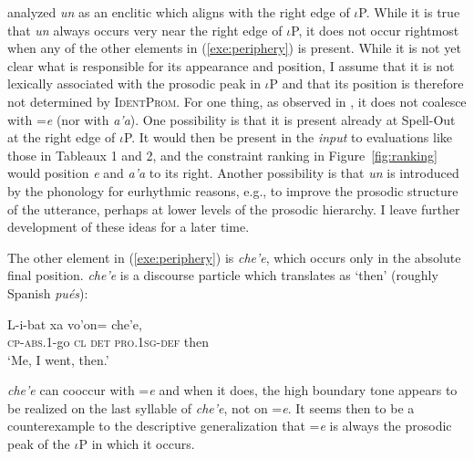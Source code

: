 \documentclass[output=paper,
modfonts
]{LSP/langsci}
\begin{document}
 \citet{aissen1992} analyzed \emph{un} as an enclitic which aligns with the right edge of $\iota$P. 
While it is true that \emph{un} always occurs very near the right edge of $\iota$P,  it does not occur rightmost when any of the other elements in (\ref{exe:periphery}) is present. 
While it is not yet clear what is responsible for its appearance and position, I assume that it is not lexically associated
with the prosodic peak in $\iota$P and that its position is therefore not determined by \textsc{IdentProm}. For one thing, as
observed in \citet{skopeteas2010}, it does not coalesce with =\emph{e} (nor with \emph{a'a}). 
One possibility is that it is present already at Spell-Out at the right edge of $\iota$P. 
It would then be present in the \emph{input} to evaluations like those in Tableaux 1 and 2,
 and the constraint ranking in Figure~\ref{fig:ranking} would position \emph{e} and \emph{a'a} to its right.
Another possibility is that \emph{un} is introduced by the phonology for eurhythmic reasons, e.g., 
to improve the prosodic structure of the utterance, perhaps at lower levels of the prosodic hierarchy. 
I leave further  development of these ideas for a later time.

The other element in (\ref{exe:periphery}) is \emph{che'e}, which occurs only in the absolute final position.  
\emph{che'e} is a discourse particle which \citet{laughlin1975} translates
as `then' (roughly Spanish \emph{pu\'es}): 
\begin{exe}
\ex\label{exe:che'ee}\bridgeoverex
\gll L-i-bat xa  vo'on= che'e, \\
\textsc{cp-abs.1}-go \textsc{cl}  \textsc{det} \textsc{pro.1sg}-\textsc{def} then \\
\glt `Me, I went, then.'  \citep[131]{laughlin1977}
\end{exe}
\emph{che'e} can cooccur with =\emph{e} and when
it does, the high boundary tone appears to be realized on the last syllable of \emph{che'e}, 
not on =\emph{e}. It seems then to be a counterexample to the descriptive
generalization that =\emph{e} is always the prosodic peak of the $\iota$P in which it occurs.   
\end{document}
